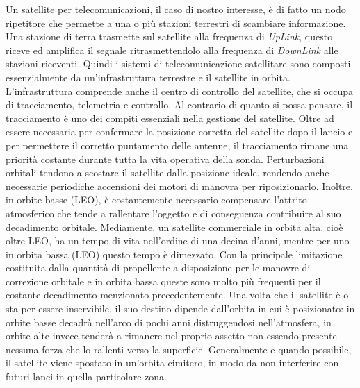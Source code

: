\documentclass[12pt,a4paper,oneside]{book}
\begin{document}
			Un satellite per telecomunicazioni, il caso di nostro interesse, è di fatto un nodo ripetitore che permette a una o più stazioni terrestri di scambiare informazione. Una stazione di terra trasmette sul satellite alla frequenza di {\it UpLink}, questo riceve ed amplifica il segnale ritrasmettendolo alla frequenza di {\it DownLink} alle stazioni riceventi. Quindi i sistemi di telecomunicazione satellitare sono composti essenzialmente da un'infrastruttura terrestre e il satellite in orbita. L'infrastruttura comprende anche il centro di controllo del satellite, che si occupa di tracciamento, telemetria e controllo. Al contrario di quanto si possa pensare, il tracciamento è uno dei compiti essenziali nella gestione del satellite. Oltre ad essere necessaria per confermare la posizione corretta del satellite dopo il lancio e per permettere il corretto puntamento delle antenne, il tracciamento rimane una priorità costante durante tutta la vita operativa della sonda. Perturbazioni orbitali tendono a scostare il satellite dalla posizione ideale, rendendo anche necessarie periodiche accensioni dei motori di manovra per riposizionarlo. Inoltre, in orbite basse (LEO), è costantemente necessario compensare l'attrito atmosferico che tende a rallentare l'oggetto e di conseguenza contribuire al suo decadimento orbitale. 
			Mediamente, un satellite commerciale in orbita alta, cioè oltre LEO, ha un tempo di vita nell'ordine di una decina d'anni, mentre per uno in orbita bassa (LEO) questo tempo è dimezzato. Con la principale limitazione costituita dalla quantità di propellente a disposizione per le manovre di correzione orbitale e in orbita bassa queste sono molto più frequenti per il costante decadimento menzionato precedentemente. Una volta che il satellite è o sta per essere inservibile, il suo destino dipende dall'orbita in cui è posizionato: in orbite basse decadrà nell'arco di pochi anni distruggendosi nell'atmosfera, in orbite alte invece tenderà a rimanere nel proprio assetto non essendo presente nessuna forza che lo rallenti verso la superficie. Generalmente e quando possibile, il satellite viene spostato in un'orbita cimitero, in modo da non interferire con futuri lanci in quella particolare zona. 
			
			
\end{document}
